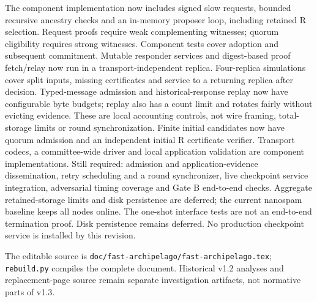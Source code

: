 \documentclass[11pt]{article}
\begin{document}
The component implementation now includes signed slow requests, bounded recursive
ancestry checks and an in-memory proposer loop, including retained R selection.
Request proofs require weak complementing witnesses; quorum eligibility requires
strong witnesses. Component tests cover adoption and subsequent commitment.
Mutable responder services and digest-based proof fetch/relay now run in a
transport-independent replica. Four-replica simulations cover split inputs,
missing certificates and service to a returning replica after decision.
Typed-message admission and historical-response replay now have configurable byte
budgets; replay also has a count limit and rotates fairly without evicting evidence.
These are local accounting controls, not wire framing, total-storage limits or
round synchronization.
Finite initial candidates now have quorum admission and an independent initial R
certificate verifier. Transport codecs, a committee-wide driver and local
application validation are component implementations. Still required: admission
and application-evidence dissemination, retry scheduling and a round synchronizer,
live checkpoint service integration, adversarial timing coverage and Gate B
end-to-end checks. Aggregate retained-storage limits and disk persistence are
deferred; the current nanospam baseline keeps all nodes online. The one-shot interface tests are not an end-to-end termination proof.
Disk persistence remains deferred. No production checkpoint service is installed
by this revision.

The editable source is \texttt{doc/fast-archipelago/fast-archipelago.tex};
\texttt{rebuild.py} compiles the complete document. Historical v1.2 analyses and
replacement-page source remain separate investigation artifacts, not normative
parts of v1.3.
\end{document}
